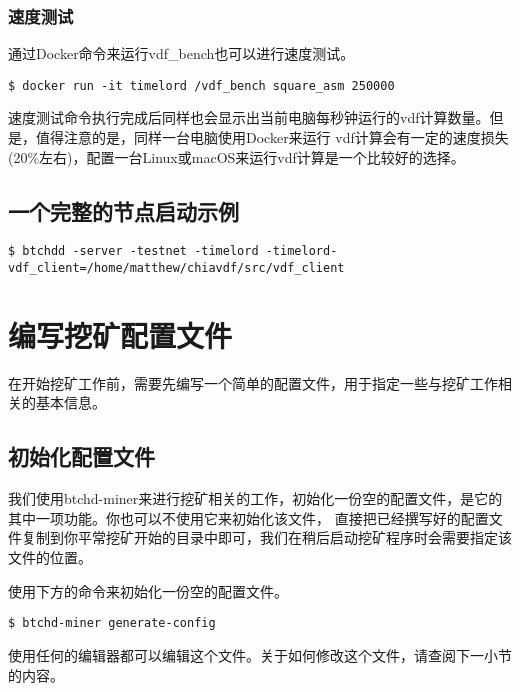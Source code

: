 \begin{flushleft}
\subsubsection{速度测试}
\begin{flushleft}
    通过Docker命令来运行vdf\_bench也可以进行速度测试。
\end{flushleft}
\scriptsize
\begin{verbatim}
$ docker run -it timelord /vdf_bench square_asm 250000
\end{verbatim}
\normalsize
\begin{flushleft}
    速度测试命令执行完成后同样也会显示出当前电脑每秒钟运行的vdf计算数量。但是，值得注意的是，同样一台电脑使用Docker来运行
    vdf计算会有一定的速度损失(20\%左右)，配置一台Linux或macOS来运行vdf计算是一个比较好的选择。
\end{flushleft}
\subsection{一个完整的节点启动示例}
\scriptsize
\begin{verbatim}
$ btchdd -server -testnet -timelord -timelord-vdf_client=/home/matthew/chiavdf/src/vdf_client
\end{verbatim}
\normalsize
\section{编写挖矿配置文件}
\begin{flushleft}
    在开始挖矿工作前，需要先编写一个简单的配置文件，用于指定一些与挖矿工作相关的基本信息。
\end{flushleft}
\subsection{初始化配置文件}
\begin{flushleft}
    我们使用btchd-miner来进行挖矿相关的工作，初始化一份空的配置文件，是它的其中一项功能。你也可以不使用它来初始化该文件，
    直接把已经撰写好的配置文件复制到你平常挖矿开始的目录中即可，我们在稍后启动挖矿程序时会需要指定该文件的位置。
\end{flushleft}
\begin{flushleft}
    使用下方的命令来初始化一份空的配置文件。
\end{flushleft}
\scriptsize
\begin{verbatim}
$ btchd-miner generate-config
\end{verbatim}
\normalsize
\begin{flushleft}
    使用任何的编辑器都可以编辑这个文件。关于如何修改这个文件，请查阅下一小节的内容。
\end{flushleft}

\end{flushleft}

